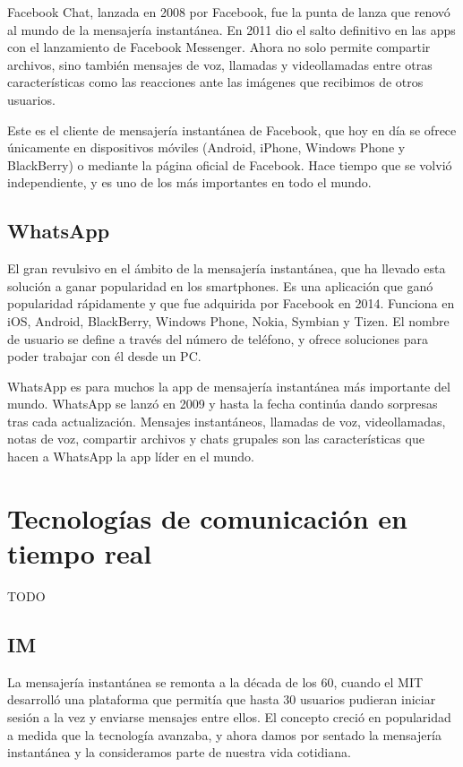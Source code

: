 Facebook Chat, lanzada en 2008 por Facebook, fue la punta de lanza que renovó al mundo de la mensajería instantánea. En 2011 dio el salto definitivo en las apps con el lanzamiento de Facebook Messenger. Ahora no solo permite compartir archivos, sino también mensajes de voz, llamadas y videollamadas entre otras características como las reacciones ante las imágenes que recibimos de otros usuarios.

Este es el cliente de mensajería instantánea de Facebook, que hoy en día se ofrece únicamente en dispositivos móviles (Android, iPhone, Windows Phone y BlackBerry) o mediante la página oficial de Facebook. Hace tiempo que se volvió independiente, y es uno de los más importantes en todo el mundo.

\subsection{WhatsApp}

El gran revulsivo en el ámbito de la mensajería instantánea, que ha llevado esta solución a ganar popularidad en los smartphones. Es una aplicación que ganó popularidad rápidamente y que fue adquirida por Facebook en 2014. Funciona en iOS, Android, BlackBerry, Windows Phone, Nokia, Symbian y Tizen. El nombre de usuario se define a través del número de teléfono, y ofrece soluciones para poder trabajar con él desde un PC.

WhatsApp es para muchos la app de mensajería instantánea más importante del mundo. WhatsApp se lanzó en 2009 y hasta la fecha continúa dando sorpresas tras cada actualización. Mensajes instantáneos, llamadas de voz, videollamadas, notas de voz, compartir archivos y chats grupales son las características que hacen a WhatsApp la app líder en el mundo.

\section{Tecnologías de comunicación en tiempo real}

TODO

\subsection{IM}

La mensajería instantánea se remonta a la década de los 60, cuando el MIT desarrolló una plataforma que permitía que hasta 30 usuarios pudieran iniciar sesión a la vez y enviarse mensajes entre ellos. El concepto creció en popularidad a medida que la tecnología avanzaba, y ahora damos por sentado la mensajería instantánea y la consideramos parte de nuestra vida cotidiana.


